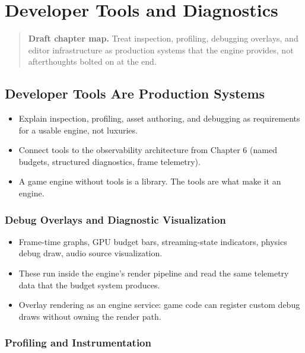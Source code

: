 \documentclass[
  11pt,
  letterpaper,
  DIV=11,
  numbers=noendperiod,
  twoside,
  open=right]{scrreprt}
\providecommand{\tightlist}{%
  \setlength{\itemsep}{0pt}\setlength{\parskip}{0pt}}
\begin{document}
\chapter{Developer Tools and
Diagnostics}\label{developer-tools-and-diagnostics}

\begin{quote}
\textbf{Draft chapter map.} Treat inspection, profiling, debugging
overlays, and editor infrastructure as production systems that the
engine provides, not afterthoughts bolted on at the end.
\end{quote}

\section{Developer Tools Are Production
Systems}\label{developer-tools-are-production-systems}

\begin{itemize}
\tightlist
\item
  Explain inspection, profiling, asset authoring, and debugging as
  requirements for a usable engine, not luxuries.
\item
  Connect tools to the observability architecture from Chapter 6 (named
  budgets, structured diagnostics, frame telemetry).
\item
  A game engine without tools is a library. The tools are what make it
  an engine.
\end{itemize}

\subsection{Debug Overlays and Diagnostic
Visualization}\label{debug-overlays-and-diagnostic-visualization}

\begin{itemize}
\tightlist
\item
  Frame-time graphs, GPU budget bars, streaming-state indicators,
  physics debug draw, audio source visualization.
\item
  These run inside the engine's render pipeline and read the same
  telemetry data that the budget system produces.
\item
  Overlay rendering as an engine service: game code can register custom
  debug draws without owning the render path.
\end{itemize}

\subsection{Profiling and
Instrumentation}\label{profiling-and-instrumentation}
\end{document}
